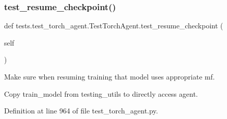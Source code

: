 \subsubsection{\texorpdfstring{test\+\_\+resume\+\_\+checkpoint()}{test\_resume\_checkpoint()}}
{\footnotesize\ttfamily def tests.\+test\+\_\+torch\+\_\+agent.\+Test\+Torch\+Agent.\+test\+\_\+resume\+\_\+checkpoint (\begin{DoxyParamCaption}\item[{}]{self }\end{DoxyParamCaption})}

\begin{DoxyVerb}Make sure when resuming training that model uses appropriate mf.

Copy train_model from testing_utils to directly access agent.
\end{DoxyVerb}
 

Definition at line 964 of file test\+\_\+torch\+\_\+agent.\+py.


